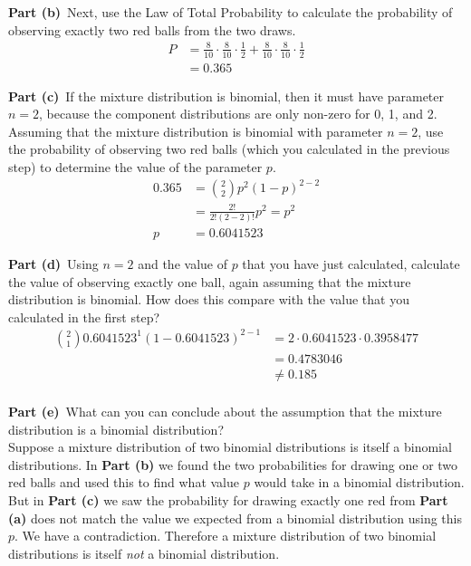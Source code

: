 \documentclass[12pt]{article}
\theoremstyle{definition}
\begin{document}
\vspace{3.5in}
\noindent
{\bf Part (b)}\ Next, use the Law of Total Probability to calculate the probability of observing exactly two red balls from the two draws.
\begin{align*}
P &= \frac{8}{10} \cdot \frac{8}{10}\cdot \frac{1}{2} + \frac{8}{10} \cdot \frac{8}{10}\cdot \frac{1}{2}\\
&= 0.365
\end{align*}


\newpage
\noindent
{\bf Part (c)}\ If the mixture distribution is binomial, then it must have parameter $n = 2$, because the component distributions are only non-zero for 0, 1, and 2. Assuming that the  mixture distribution is binomial with parameter $n = 2$, use the probability of observing two red balls (which you calculated in the previous step) to determine the value of the parameter $p$.
\begin{align*}
0.365 &= \binom{2}{2} p^2(1 - p) ^{2-2}\\
&= \frac{2!}{2!(2-2)!}p^2 = p^2\\
p&= 0.6041523
\end{align*}

\vspace{3in}
\noindent
{\bf Part (d)}\ Using $n = 2$ and the value of $p$ that you have just calculated, calculate the value of observing exactly one ball, again assuming that the mixture distribution is binomial. How does this compare with the value that you calculated in the first step?
\begin{align*}
\binom{2}{1}0.6041523^1(1-0.6041523)^{2-1} &= 2 \cdot 0.6041523 \cdot 0.3958477\\
&= 0.4783046\\
&\neq 0.185\\
\end{align*}

\newpage
\noindent
{\bf Part (e)}\ What can you can conclude about the assumption that the mixture distribution is a binomial distribution?\\

Suppose a mixture distribution of two binomial distributions is itself a binomial distributions. In \textbf{Part (b)} we found the two probabilities for drawing one or two red balls and used this to find what value $p$ would take in a binomial distribution. But in \textbf{Part (c)} we saw the probability for drawing exactly one red from \textbf{Part (a)} does not match the value we expected from a binomial distribution using this $p$. We have a contradiction. Therefore a mixture distribution of two binomial distributions is itself \textit{not} a binomial distribution.
\end{document}
